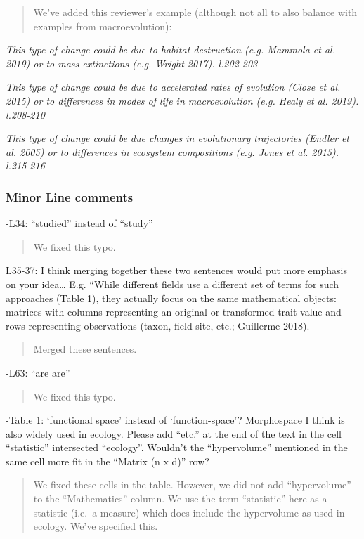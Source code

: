 \documentclass[]{article}
\begin{document}
\begin{quote}
We've added this reviewer's example (although not all to also balance
with examples from macroevolution):
\end{quote}

\textit{This type of change could be due to habitat destruction (e.g. Mammola et
al. 2019) or to mass extinctions (e.g. Wright 2017). l.202-203}

\textit{This type of change could be due to accelerated rates of evolution
(Close et al. 2015) or to differences in modes of life in macroevolution
(e.g. Healy et al. 2019). l.208-210}

\textit{This type of change could be due changes in evolutionary trajectories
(Endler et al. 2005) or to differences in ecosystem compositions (e.g.
Jones et al. 2015). l.215-216}

\subsubsection{Minor Line comments}\label{minor-line-comments}

-L34: ``studied'' instead of ``study''

\begin{quote}
We fixed this typo.
\end{quote}

L35-37: I think merging together these two sentences would put more
emphasis on your idea\ldots{} E.g. ``While different fields use a
different set of terms for such approaches (Table 1), they actually
focus on the same mathematical objects: matrices with columns
representing an original or transformed trait value and rows
representing observations (taxon, field site, etc.; Guillerme 2018).

\begin{quote}
Merged these sentences.
\end{quote}

-L63: ``are are''

\begin{quote}
We fixed this typo.
\end{quote}

-Table 1: `functional space' instead of `function-space'? Morphospace I
think is also widely used in ecology. Please add ``etc.'' at the end of
the text in the cell ``statistic'' intersected ``ecology''. Wouldn't the
``hypervolume'' mentioned in the same cell more fit in the ``Matrix (n x
d)'' row?

\begin{quote}
We fixed these cells in the table. However, we did not add
``hypervolume'' to the ``Mathematics'' column. We use the term
``statistic'' here as a statistic (i.e.~a measure) which does include
the hypervolume as used in ecology. We've specified this.
\end{quote}
\end{document}
